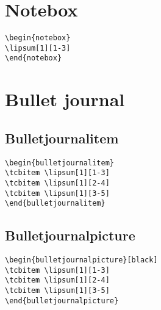 
\section{Notebox}
\begin{highlightbox}
\begin{verbatim}
\begin{notebox}
\lipsum[1][1-3]
\end{notebox}
\end{verbatim}
\end{highlightbox}
\begin{notebox}
\lipsum[1][1-3]
\end{notebox}

\section{Bullet journal }

\subsection{Bulletjournalitem}

\lipsum[1][1-3]
\begin{highlightbox}
\begin{verbatim}
\begin{bulletjournalitem}
\tcbitem \lipsum[1][1-3]
\tcbitem \lipsum[1][2-4]
\tcbitem \lipsum[1][3-5]
\end{bulletjournalitem}
\end{verbatim}
\end{highlightbox}
\begin{bulletjournalitem}
\tcbitem \lipsum[1][1-3]
\tcbitem \lipsum[1][2-4]
\tcbitem \lipsum[1][3-5]
\end{bulletjournalitem}

\subsection{Bulletjournalpicture}

\lipsum[1][1-3]
\begin{highlightbox}
\begin{verbatim}
\begin{bulletjournalpicture}[black]
\tcbitem \lipsum[1][1-3]
\tcbitem \lipsum[1][2-4]
\tcbitem \lipsum[1][3-5]
\end{bulletjournalpicture}
\end{verbatim}
\end{highlightbox}
\begin{bulletjournalpicture}[black]
\tcbitem \lipsum[1][1-3]
\tcbitem \lipsum[1][2-4]
\tcbitem \lipsum[1][3-5]
\end{bulletjournalpicture}

